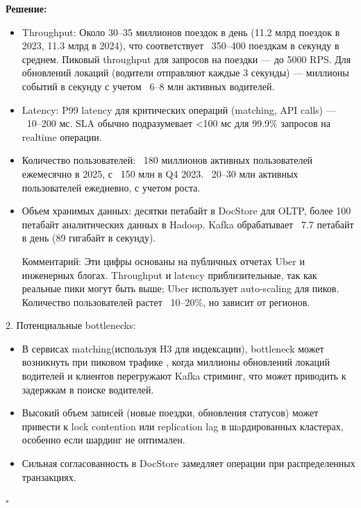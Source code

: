 \documentclass[12pt]{article}
\newenvironment{solution}
{
  \par\textbf{Решение:}\par\bigbreak
  \begingroup
}
{
  \par\bigbreak\hfill$\square$%
  \par\endgroup
}
\begin{document}
\begin{solution}
\begin{itemize}
    Оценка нагрузки и гарантии:
    \item Throughput: Около 30–35 миллионов поездок в день (11.2 млрд поездок в 2023, 11.3 млрд в 2024), что соответствует ~350–400 поездкам в секунду в среднем. Пиковый throughput для запросов на поездки — до 5000 RPS. Для обновлений локаций (водители отправляют каждые 3 секунды) — миллионы событий в секунду с учетом ~6–8 млн активных водителей.
    \item Latency: P99 latency для критических операций (matching, API calls) — ~10–200 мс. SLA обычно подразумевает <100 мс для 99.9\% запросов на realtime операции.
    \item Количество пользователей: ~180 миллионов активных пользователей ежемесячно в 2025, с ~150 млн в Q4 2023. ~20–30 млн активных пользователей ежедневно, с учетом роста.
    \item Объем хранимых данных: десятки петабайт в DocStore для OLTP, более 100 петабайт аналитических данных в Hadoop. Kafka обрабатывает ~7.7 петабайт в день (89 гигабайт в секунду).

    Комментарий:
    Эти цифры основаны на публичных отчетах Uber и инженерных блогах. Throughput и latency приблизительные, так как реальные пики могут быть выше; Uber использует auto-scaling для пиков. Количество пользователей растет ~10–20\%, но зависит от регионов.
\end{itemize}

2. Потенциальные bottlenecks:
\begin{itemize}
	\item В сервисах matching(используя H3 для индексации), bottleneck может возникнуть при пиковом трафике , когда миллионы обновлений локаций водителей и клиентов перегружают Kafka стриминг, что может приводить к задержкам в поиске водителей.
	\item Высокий объем записей (новые поездки, обновления статусов) может привести к lock contention или replication lag в шaрдированных кластерах, особенно если шардинг не оптимален.
	\item Сильная согласованность в DocStore замедляет операции при распределенных транзакциях.
\end{itemize}


\end{solution}
\end{document}
